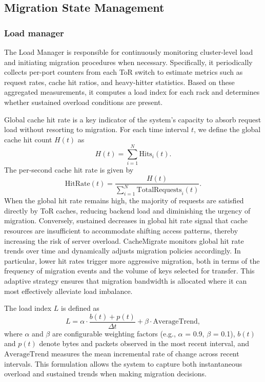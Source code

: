 \documentclass[conference]{IEEEtran}
\begin{document}
\subsection{Migration State Management}

\subsubsection{Load manager}
\label{subsec:load_manager}
The Load Manager is responsible for continuously monitoring cluster-level load and initiating migration procedures when necessary. Specifically, it periodically collects per-port counters from each ToR switch to estimate metrics such as request rates, cache hit ratios, and heavy-hitter statistics. Based on these aggregated measurements, it computes a load index for each rack and determines whether sustained overload conditions are present.

Global cache hit rate is a key indicator of the system's capacity to absorb request load without resorting to migration. For each time interval \( t \), we define the global cache hit count \( H(t) \) as
\begin{equation}
    H(t) = \sum_{i = 1}^{N} \mathrm{Hits}_i(t).
\end{equation}
The per-second cache hit rate is given by
\begin{equation}
    \mathrm{HitRate}(t) = \frac{H(t)}{\sum_{i = 1}^{N} \mathrm{TotalRequests}_i(t)}.
\end{equation}
When the global hit rate remains high, the majority of requests are satisfied directly by ToR caches, reducing backend load and diminishing the urgency of migration. Conversely, sustained decreases in global hit rate signal that cache resources are insufficient to accommodate shifting access patterns, thereby increasing the risk of server overload. CacheMigrate monitors global hit rate trends over time and dynamically adjusts migration policies accordingly. In particular, lower hit rates trigger more aggressive migration, both in terms of the frequency of migration events and the volume of keys selected for transfer. This adaptive strategy ensures that migration bandwidth is allocated where it can most effectively alleviate load imbalance.

The load index $L$ is defined as
\begin{equation}
    \label{eq:load_index}
    L = \alpha \cdot \frac{b(t) + p(t)}{\Delta t} + \beta \cdot \mathrm{AverageTrend},
\end{equation}
where $\alpha$ and $\beta$ are configurable weighting factors (e.g., $\alpha$ = 0.9, $\beta$ = 0.1), \( b(t) \) and \( p(t) \) denote bytes and packets observed in the most recent interval,
and \( \mathrm{AverageTrend} \) measures the mean incremental rate of change across recent intervals. This formulation allows the system to capture both instantaneous overload and sustained trends when making migration decisions.
\end{document}
